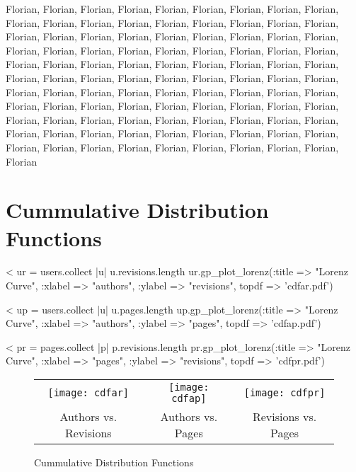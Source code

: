 \documentclass{scrartcl}
\begin{document}
Florian, Florian, Florian, Florian, Florian, Florian, Florian, Florian, Florian, Florian, Florian, Florian, Florian, Florian, Florian, Florian, Florian, Florian, Florian, Florian, Florian, Florian, Florian, Florian, Florian, Florian, Florian, Florian, Florian, Florian, Florian, Florian, Florian, Florian, Florian, Florian, Florian, Florian, Florian, Florian, Florian, Florian, Florian, Florian, Florian, Florian, Florian, Florian, Florian, Florian, Florian, Florian, Florian, Florian, Florian, Florian, Florian, Florian, Florian, Florian, Florian, Florian, Florian, Florian, Florian, Florian, Florian, Florian, Florian, Florian, Florian, Florian, Florian, Florian, Florian, Florian, Florian, Florian, Florian, Florian, Florian, Florian, Florian, Florian, Florian, Florian, Florian, Florian, Florian, Florian, Florian, Florian, Florian, Florian, Florian, Florian, Florian, Florian, Florian, Florian




\section{Cummulative Distribution Functions} %
\label{sec:cummulative_distribution_functions}

<%
ur = users.collect { |u| u.revisions.length }
ur.gp_plot_lorenz(:title => "Lorenz Curve", :xlabel => "authors", :ylabel => "revisions", topdf => 'cdfar.pdf')

<%
up = users.collect { |u| u.pages.length }
up.gp_plot_lorenz(:title => "Lorenz Curve", :xlabel => "authors", :ylabel => "pages", topdf => 'cdfap.pdf')

<%
pr = pages.collect { |p| p.revisions.length }
pr.gp_plot_lorenz(:title => "Lorenz Curve", :xlabel => "pages", :ylabel => "revisions", topdf => 'cdfpr.pdf')

\begin{figure}[htbp]
  \centering
  \begin{tabular}{@{}ccc@{}}
    \texttt{[image: cdfar]} &
    \texttt{[image: cdfap]} &
    \texttt{[image: cdfpr]}\\
    Authors vs. Revisions &
    Authors vs. Pages &
    Revisions vs. Pages
  \end{tabular}
  \caption{Cummulative Distribution Functions}
  \label{fig:cummulative_distribution_functions}
\end{figure}
\end{document}
